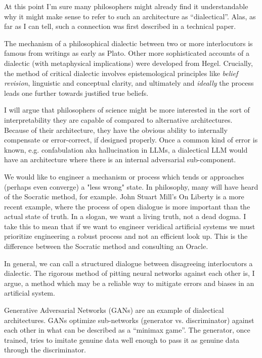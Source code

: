 \documentclass[11pt, oneside]{article}   	%
\begin{document}
At this point I'm sure many philosophers might already find it understandable why it might make sense to refer to such an architecture as ``dialectical''.  Alas, as far as I can tell, such a connection was first described in a technical paper.

The mechanism of a philosophical dialectic between two or more interlocutors is famous from writings as early as Plato.  Other more sophisticated accounts of a dialectic (with metaphysical implications) were developed from Hegel.  \citep{sep-hegel-dialectics}  Crucially, the method of critical dialectic involves epistemological principles like \emph{belief revision}, linguistic and conceptual clarity, and ultimately and \emph{ideally} the process leads one further towards justified true beliefs. 





I will argue that philosophers of science might be more interested in the sort of interpretability they are capable of compared to alternative architectures.  Because of their architecture, they have the obvious ability to internally compensate or error-correct, if designed properly.  Once a common kind of error is known, e.g. confabulation aka hallucination in LLMs, a dialectical LLM would have an architecture where there is an internal adversarial sub-component.







We would like to engineer a mechanism or process which tends or approaches (perhaps even converge) a "less wrong" state.  In philosophy, many will have heard of the Socratic method, for example.  John Stuart Mill's On Liberty is a more recent example, where the process of open dialogue is more important than the actual state of truth.  In a slogan, we want a living truth, not a dead dogma.  I take this to mean that if we want to engineer veridical artificial systems we must prioritize engineering a robust process and not an efficient look up.  This is the difference between the Socratic method and consulting an Oracle.

In general, we can call a structured dialogue between disagreeing interlocutors a dialectic.  The rigorous method of pitting neural networks against each other is, I argue, a method which may be a reliable way to mitigate errors and biases in an artificial system.  

Generative Adversarial Networks (GANs) are an example of dialectical architectures.  GANs optimize sub-networks (generator vs. discriminator) against each other in what can be described as a ``minimax game''.  \citep{GANS2014}  The generator, once trained, tries to imitate genuine data well enough to pass it as genuine data through the discriminator. 
\end{document}

